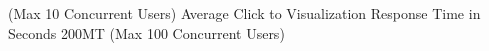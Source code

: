 (Max 10 Concurrent Users) Average Click to Visualization Response Time in Seconds 200MT (Max 100 Concurrent Users)